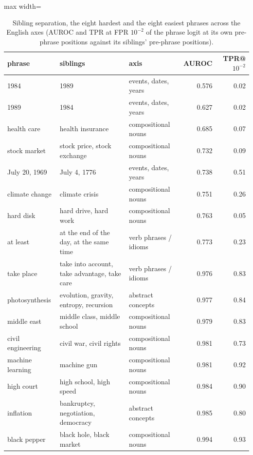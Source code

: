 \begin{table}[t]
\centering
\footnotesize
\caption{Sibling separation, the eight hardest and the eight easiest phrases across the English axes (AUROC and TPR at FPR $10^{-2}$ of the phrase logit at its own pre-phrase positions against its siblings' pre-phrase positions).}
\label{tab:gen_siblings}
\begin{adjustbox}{max width=\textwidth}
\begin{tabular}{lllrr}
\toprule
phrase & siblings & axis & AUROC & TPR@$10^{-2}$ \\
\midrule
1984 & 1989 & events, dates, years & 0.576 & 0.02 \\
1989 & 1984 & events, dates, years & 0.627 & 0.02 \\
health care & health insurance & compositional nouns & 0.685 & 0.07 \\
stock market & stock price, stock exchange & compositional nouns & 0.732 & 0.09 \\
July 20, 1969 & July 4, 1776 & events, dates, years & 0.738 & 0.51 \\
climate change & climate crisis & compositional nouns & 0.751 & 0.26 \\
hard disk & hard drive, hard work & compositional nouns & 0.763 & 0.05 \\
at least & at the end of the day, at the same time & verb phrases / idioms & 0.773 & 0.23 \\
\midrule
take place & take into account, take advantage, take care & verb phrases / idioms & 0.976 & 0.83 \\
photosynthesis & evolution, gravity, entropy, recursion & abstract concepts & 0.977 & 0.84 \\
middle east & middle class, middle school & compositional nouns & 0.979 & 0.83 \\
civil engineering & civil war, civil rights & compositional nouns & 0.981 & 0.73 \\
machine learning & machine gun & compositional nouns & 0.981 & 0.92 \\
high court & high school, high speed & compositional nouns & 0.984 & 0.90 \\
inflation & bankruptcy, negotiation, democracy & abstract concepts & 0.985 & 0.80 \\
black pepper & black hole, black market & compositional nouns & 0.994 & 0.93 \\
\bottomrule
\end{tabular}
\end{adjustbox}
\end{table}